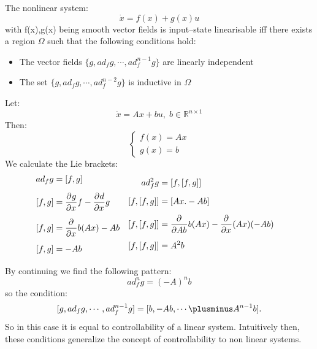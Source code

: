 \thm{}
{
    The nonlinear system:
    \begin{equation}
        \dot{x} = f(x) + g(x)u
    \end{equation}
    with f(x),g(x) being smooth vector fields is input--state linearisable iff there exists a region $\Omega$ such that the following
    conditions hold:
    \begin{itemize}
        \item The vector fields $\{g, ad_fg,\cdots ,ad^{n-1}_fg\}$ are linearly independent
        \item The set $\{g, ad_fg,\cdots ,ad^{n-2}_fg\}$ is inductive in $\Omega$
    \end{itemize}

    \ex{}
    {
        Let:
        \begin{equation}
            \dot{x} = Ax+bu, \; b\in \mathbb{R}^{n\times1}
        \end{equation}
        Then:
        \begin{equation}
            \begin{cases}
                f(x) = Ax\\
                g(x) = b
            \end{cases}
        \end{equation}
        We calculate the Lie brackets:
        \begin{equation}
            \begin{aligned}
                ad_fg&=[f,g]&\mbox{}\\[1.25ex]
                [f,g]&= \pdv{g}{x}f - \pdv{d}{x}g&\mbox{}\\[1.25ex]
                [f,g]&= \pdv{}{x}b(Ax) - Ab&\mbox{}\\[1.25ex]
                [f,g]&=-Ab&\mbox{}\\[1.25ex]
            \end{aligned}
            \begin{aligned}
                ad_f^{2}g&=[f,[f,g]]&\mbox{}\\[1.25ex]
                [f,[f,g]]&=[Ax. -Ab]&\mbox{}\\[1.25ex]
                [f,[f,g]]&= \pdv{}{Ab}b(Ax) - \pdv{}{x}(Ax)(-Ab)&\mbox{}\\[1.25ex]
                [f,[f,g]]&=A^{2}b&\mbox{}\\[1.25ex]
            \end{aligned}

        \end{equation}
        By continuing we find the following pattern:
        \begin{equation}
            ad_f^{n}g=(-A)^{n}b
        \end{equation}
        so the condition:
        \[
            [g,ad_fg,\cdots ,ad_f^{n-1}g] = [b, -Ab, \cdots \plusminus A^{n-1}b]
        .\] 
        So in this case it is equal to controllability of a linear system.
        Intuitively then, these conditions generalize the concept of controllability to non linear systems.
    }

}

